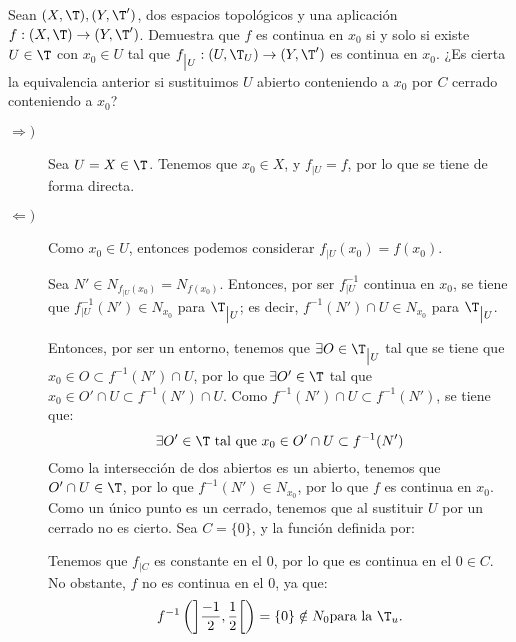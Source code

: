 \begin{ejercicio}
    Sean $(X, \T ), (Y, \T')$, dos espacios topológicos y una aplicación $f : (X, \T ) \to (Y, \T')$.
    Demuestra que $f$ es continua en $x_0$ si y solo si existe $U \in \T$ con $x_0 \in U$ tal que $f_{\big|U} : (U, \T_U ) \to (Y, \T')$ es continua en $x_0$. ¿Es cierta la equivalencia anterior si sustituimos $U$ abierto conteniendo a $x_0$ por $C$ cerrado conteniendo a $x_0$?

    \begin{description}
        \item[$\Longrightarrow)$] Sea $U=X\in \T$. Tenemos que $x_0\in X$, y $f_{\big| U}=f$, por lo que se tiene de forma directa.

        \item[$\Longleftarrow)$] Como $x_0\in U$, entonces podemos considerar $f_{\big| U}(x_0)=f(x_0)$.
        
        Sea $N'\in N_{f_{| U}(x_0)}=N_{f(x_0)}$. Entonces, por ser $f^{-1}_{\big | U}$ continua en $x_0$, se tiene que $f^{-1}_{\big | U}(N')\in N_{x_0}$ para $\T_{\big | U}$; es decir, $f^{-1}(N')\cap U \in N_{x_0}$ para $\T_{\big | U}$.

        Entonces, por ser un entorno, tenemos que $\exists O\in \T_{\big| U}$ tal que se tiene que $x_0\in O\subset f^{-1}(N')\cap U$, por lo que $\exists O'\in \T$ tal que $x_0\in O'\cap U \subset f^{-1}(N')\cap U$. Como $f^{-1}(N')\cap U\subset f^{-1}(N')$, se tiene que:        \begin{equation*}
            \exists O'\in \T \text{ tal que } x_0\in O'\cap U \subset f^{-1}(N')
        \end{equation*}
        Como la intersección de dos abiertos es un abierto, tenemos que $O'\cap U\in \T$, por lo que $f^{-1}(N')\in N_{x_0}$, por lo que $f$ es continua en $x_0$.\\

        Como un único punto es un cerrado, tenemos que al sustituir $U$ por un cerrado no es cierto. Sea $C=\{0\}$, y la función definida por:

        Tenemos que $f_{\big| C}$ es constante en el $0$, por lo que es continua en el $0\in C$. No obstante, $f$ no es continua en el $0$, ya que:
        \begin{equation*}
            f^{-1}\left(\left]\frac{-1}{2},\frac{1}{2}\right[\right) = \{0\}\notin N_{0} \text{para la $\T_u$.}
        \end{equation*}
    \end{description}
\end{ejercicio}

